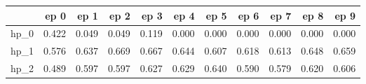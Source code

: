 \begin{tabular}{lrrrrrrrrrr}
\toprule
{} &   ep 0 &   ep 1 &   ep 2 &   ep 3 &   ep 4 &   ep 5 &   ep 6 &   ep 7 &   ep 8 &   ep 9 \\
\midrule
hp\_0 &  0.422 &  0.049 &  0.049 &  0.119 &  0.000 &  0.000 &  0.000 &  0.000 &  0.000 &  0.000 \\
hp\_1 &  0.576 &  0.637 &  0.669 &  0.667 &  0.644 &  0.607 &  0.618 &  0.613 &  0.648 &  0.659 \\
hp\_2 &  0.489 &  0.597 &  0.597 &  0.627 &  0.629 &  0.640 &  0.590 &  0.579 &  0.620 &  0.606 \\
\bottomrule
\end{tabular}
